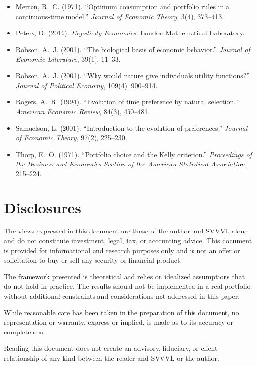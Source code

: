 \documentclass[11pt]{article}
\begin{document}
\begin{itemize}
  \item[{[10]}]\hypertarget{ref:10}{} Merton, R.~C. (1971). ``Optimum consumption and
    portfolio rules in a continuous-time model.'' \textit{Journal of
    Economic Theory}, 3(4), 373--413.

  \item[{[11]}]\hypertarget{ref:11}{} Peters, O. (2019). \textit{Ergodicity Economics}.
    London Mathematical Laboratory.

  \item[{[12]}]\hypertarget{ref:12}{} Robson, A.~J. (2001). ``The biological basis of
    economic behavior.'' \textit{Journal of Economic Literature},
    39(1), 11--33.

  \item[{[13]}]\hypertarget{ref:13}{} Robson, A.~J. (2001). ``Why would nature give
    individuals utility functions?'' \textit{Journal of Political
    Economy}, 109(4), 900--914.

  \item[{[14]}]\hypertarget{ref:14}{} Rogers, A.~R. (1994). ``Evolution of time preference
    by natural selection.'' \textit{American Economic Review},
    84(3), 460--481.

  \item[{[15]}]\hypertarget{ref:15}{} Samuelson, L. (2001). ``Introduction to the evolution
    of preferences.'' \textit{Journal of Economic Theory}, 97(2),
    225--230.

  \item[{[16]}]\hypertarget{ref:16}{} Thorp, E.~O. (1971). ``Portfolio choice and the Kelly
    criterion.'' \textit{Proceedings of the Business and Economics
    Section of the American Statistical Association}, 215--224.

\end{itemize}
\newpage
\section{Disclosures}

The views expressed in this document are those of the author and
SVVVL alone and do not constitute investment, legal, tax, or
accounting advice. This document is provided for informational and
research purposes only and is not an offer or solicitation to buy or
sell any security or financial product.

The framework presented is theoretical and relies on idealized
assumptions that do not hold in practice. The results
should not be implemented in a real portfolio without additional
constraints and considerations not addressed in this paper.

While reasonable care has been taken in the preparation of this
document, no representation or warranty, express or implied, is made
as to its accuracy or completeness.

Reading this document does not create an advisory, fiduciary, or
client relationship of any kind between the reader and SVVVL or the
author.
\end{document}
